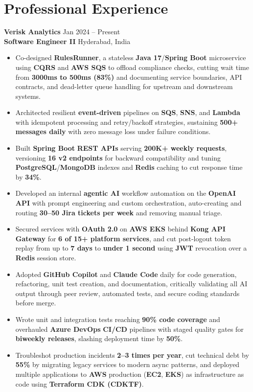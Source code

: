 \documentclass[a4paper,10pt]{article}
\begin{document}
\section*{Professional Experience}

\textbf{Verisk Analytics} \hfill Jan 2024 -- Present \\
\textbf{Software Engineer II} \hfill Hyderabad, India

\begin{itemize}[leftmargin=*]
    \item Co-designed \textbf{RulesRunner}, a stateless \textbf{Java 17}/\textbf{Spring Boot} microservice using \textbf{CQRS} and \textbf{AWS SQS} to offload compliance checks, cutting wait time from \textbf{3000ms to 500ms (83\%)} and documenting service boundaries, API contracts, and dead-letter queue handling for upstream and downstream systems.
    \item Architected resilient \textbf{event-driven} pipelines on \textbf{SQS}, \textbf{SNS}, and \textbf{Lambda} with idempotent processing and retry/backoff strategies, sustaining \textbf{500+ messages daily} with zero message loss under failure conditions.
    \item Built \textbf{Spring Boot} \textbf{REST APIs} serving \textbf{200K+ weekly requests}, versioning \textbf{16 v2 endpoints} for backward compatibility and tuning \textbf{PostgreSQL}/\textbf{MongoDB} indexes and \textbf{Redis} caching to cut response time by \textbf{34\%}.
    \item Developed an internal \textbf{agentic AI} workflow automation on the \textbf{OpenAI API} with prompt engineering and custom orchestration, auto-creating and routing \textbf{30--50 Jira tickets per week} and removing manual triage.
    \item Secured services with \textbf{OAuth 2.0} on \textbf{AWS EKS} behind \textbf{Kong API Gateway} for \textbf{6 of 15+ platform services}, and cut post-logout token replay from up to \textbf{7 days} to \textbf{under 1 second} using \textbf{JWT} revocation over a \textbf{Redis} session store.
    \item Adopted \textbf{GitHub Copilot} and \textbf{Claude Code} daily for code generation, refactoring, unit test creation, and documentation, critically validating all AI output through peer review, automated tests, and secure coding standards before merge.
    \item Wrote unit and integration tests reaching \textbf{90\% code coverage} and overhauled \textbf{Azure DevOps} \textbf{CI/CD} pipelines with staged quality gates for \textbf{biweekly releases}, slashing deployment time by \textbf{50\%}.
    \item Troubleshot production incidents \textbf{2--3 times per year}, cut technical debt by \textbf{55\%} by migrating legacy services to modern async patterns, and deployed multiple applications to \textbf{AWS} production (\textbf{EC2}, \textbf{EKS}) as infrastructure as code using \textbf{Terraform CDK (CDKTF)}.
\end{itemize}
\end{document}
